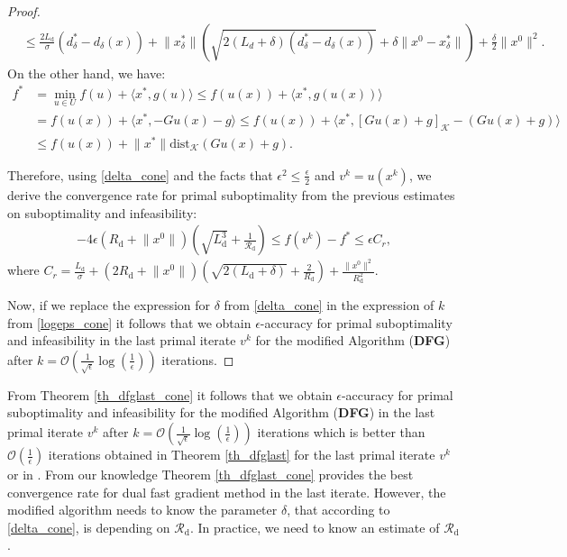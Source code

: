 \documentclass{gOMS2e}
\theoremstyle{plain}
\theoremstyle{definition}
\theoremstyle{remark}
\providecommand{\norm}[1]{\lVert#1\rVert}
\begin{document}
\begin{proof}
\begin{align*}
& \le \frac{2L_{\text{d}}}{\sigma} (d^*_{\delta} - d_{\delta}(x)) +
\norm{x^*_{\delta}} \left(\sqrt{2(L_{d}+\delta)(d^*_{\delta} -
d_{\delta}(x))} + \delta\norm{x^0-x^*_{\delta}}\right)
+\frac{\delta}{2}\norm{x^0}^2.
\end{align*}
On the other hand, we have:
\begin{align*}
f^* &=  \min_{u \in U} f(u) + \langle x^*, g(u) \rangle \leq f(u(x))
+ \langle x^*, g(u(x)) \rangle \nonumber\\
& =  f(u(x)) + \langle x^*, -G u(x) - g \rangle \leq f(u(x))
+ \langle x^*,  [G u(x) + g]_{\mathcal{K}} - (G u(x) + g) \rangle \nonumber\\
& \leq f(u(x)) + \norm{x^*} \text{dist}_{\mathcal{K}}(G u(x) + g).
\end{align*}

\noindent Therefore, using \eqref{delta_cone} and the facts that
$\epsilon^2 \le \frac{\epsilon}{2}$ and $v^k=u(x^k)$, we derive the
convergence rate for primal suboptimality from the previous
estimates on suboptimality and infeasibility:
\begin{align*}
 - 4\epsilon \left(R_{\text{d}} + \norm{x^0}\right) \left(\sqrt{L_\text{d}^3} +
\frac{1}{\mathcal{R}_{\text{d}}} \right) \le  f(v^k) - f^* \le
\epsilon C_r,
\end{align*}
where $C_r = \frac{L_{\text{d}}}{\sigma} + \left(2 R_{\text{d}} +
\norm{x^0} \right) \left(\sqrt{2(L_{\text{d}} + \delta)} +
\frac{2}{R_{\text{d}}} \right) +
\frac{\norm{x^0}^2}{R_{\text{d}}^2}$.

\vspace{5pt}

\noindent Now, if we replace the expression  for $\delta$ from
\eqref{delta_cone} in the expression of $k$ from \eqref{logeps_cone}
it follows that we obtain $\epsilon$-accuracy for primal
suboptimality and infeasibility in the last primal iterate $v^k$ for
the modified Algorithm (\textbf{DFG})  after $k =
\mathcal{O}(\frac{1}{\sqrt{\epsilon}} \log(\frac{1}{\epsilon}))$
iterations.
\end{proof}

\noindent From Theorem \ref{th_dfglast_cone} it follows that we
obtain $\epsilon$-accuracy for primal suboptimality and
infeasibility for the modified Algorithm (\textbf{DFG}) in the last
primal iterate $v^{k}$ after $k =
\mathcal{O}(\frac{1}{\sqrt{\epsilon}} \log(\frac{1}{\epsilon}))$
iterations which is  better than $\mathcal{O}(\frac{1}{\epsilon})$
iterations obtained in Theorem \ref{th_dfglast}  for the last primal
iterate $v^k$ or in \cite{BecNed:14}. From our knowledge Theorem
\ref{th_dfglast_cone} provides the best convergence rate  for dual
fast gradient method in the last iterate.  However, the modified
algorithm needs to know the parameter $\delta$, that according to
\eqref{delta_cone}, is depending on $\mathcal{R}_{\text{d}}$.  In
practice, we need to know an  estimate of $\mathcal{R}_{\text{d}}$.
\end{document}
